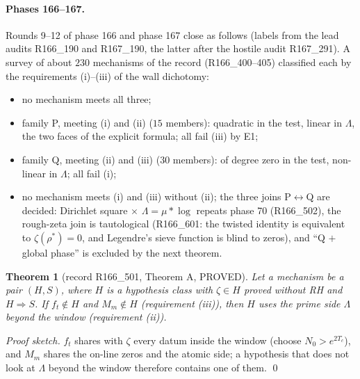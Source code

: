 \documentclass[11pt]{amsart}
\newtheorem{theorem}{Theorem}[section]
\theoremstyle{definition}
\theoremstyle{remark}
\begin{document}
\paragraph{Phases 166--167.} Rounds 9--12 of phase 166 and phase 167 close as follows (labels from the lead audits R166\_190 and
R167\_190, the latter after the hostile audit R167\_291). A survey of about $230$ mechanisms of the record (R166\_400--405) classified
each by the requirements (i)--(iii) of the wall dichotomy:
\begin{itemize}
\item no mechanism meets all three;
\item family P, meeting (i) and (ii) ($15$ members): quadratic in the test, linear in $\Lambda$, the two faces of the explicit formula; all fail (iii) by E1;
\item family Q, meeting (ii) and (iii) ($30$ members): of degree zero in the test, non-linear in $\Lambda$; all fail (i);
\item no mechanism meets (i) and (iii) without (ii); the three joins P$\leftrightarrow$Q are decided: Dirichlet square $\times$ $\Lambda=\mu*\log$ repeats phase 70 (R166\_502), the rough-zeta join is tautological (R166\_601: the twisted identity is equivalent to $\zeta(\rho^*)=0$, and Legendre's sieve function is blind to zeros), and ``Q $+$ global phase'' is excluded by the next theorem.
\end{itemize}

\begin{theorem}[record R166\_501, Theorem A, PROVED]\label{thm:iiiii}
Let a mechanism be a pair $(H,S)$, where $H$ is a hypothesis class with $\zeta\in H$ proved without RH and $H\Rightarrow S$. If
$f_t\notin H$ and $M_m\notin H$ (requirement (iii)), then $H$ uses the prime side $\Lambda$ beyond the window (requirement (ii)).
\end{theorem}

\noindent\emph{Proof sketch.} $f_t$ shares with $\zeta$ every datum inside the window (choose $N_0>e^{2T_c}$), and $M_m$ shares the
on-line zeros and the atomic side; a hypothesis that does not look at $\Lambda$ beyond the window therefore contains one of them. \qed
\end{document}
